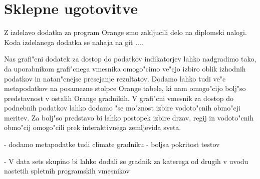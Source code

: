 \chapter{Sklepne ugotovitve}



Z izdelavo dodatka za program Orange smo zakljucili delo na diplomski nalogi.
Koda izdelanega dodatka se nahaja na git ....


% 
%
%
%
%


Nas grafi"cni dodatek za dostop do podatkov indikatorjev lahko nadgradimo tako,
da uporabnikom grafi"cnega vmesnika omogo"cimo ve"cjo izbiro oblik izhodnih
podatkov in natan"cnejse presejanje rezultatov. Dodamo lahko tudi ve"c
metapodatkov na posamezne stolpce Orange tabele, ki nam omogo"cijo bolj"so
predstavnost v ostalih Orange gradnikih. V grafi"cni vmesnik za dostop do
podnebnih podatkov lahko dodamo "se mo"znost izbire vodoto"cnih obmo"cji meritev.
Za bolj"so predstavo bi lahko postopek izbire drzav, regij in vodoto"cnih
obmo"cij omogo"cili prek interaktivnega zemljevida sveta.


- dodamo metapodatke tudi climate gradniku
- boljsa pokritost testov


- V data sets skupino bi lahko dodali se gradnik za katerega od drugih v uvodu
nastetih spletnih programskih vmesnikov
